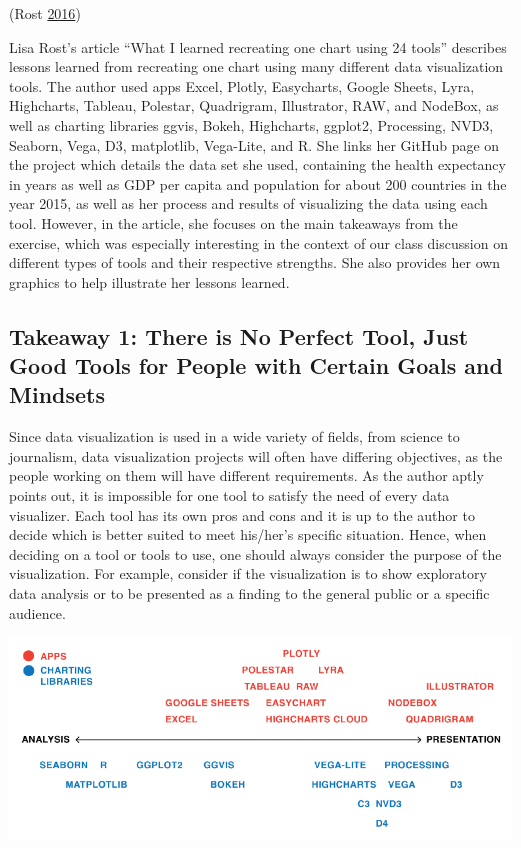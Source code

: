 \documentclass[]{book}
\begin{document}
(Rost \protect\hyperlink{ref-different_tools}{2016})

Lisa Rost's article ``What I learned recreating one chart using 24 tools'' describes lessons learned from recreating one chart using many different data visualization tools. The author used apps Excel, Plotly, Easycharts, Google Sheets, Lyra, Highcharts, Tableau, Polestar, Quadrigram, Illustrator, RAW, and NodeBox, as well as charting libraries ggvis, Bokeh, Highcharts, ggplot2, Processing, NVD3, Seaborn, Vega, D3, matplotlib, Vega-Lite, and R. She links her GitHub page on the project which details the data set she used, containing the health expectancy in years as well as GDP per capita and population for about 200 countries in the year 2015, as well as her process and results of visualizing the data using each tool. However, in the article, she focuses on the main takeaways from the exercise, which was especially interesting in the context of our class discussion on different types of tools and their respective strengths. She also provides her own graphics to help illustrate her lessons learned.

\hypertarget{takeaway-1-there-is-no-perfect-tool-just-good-tools-for-people-with-certain-goals-and-mindsets}{%
\subsection{Takeaway 1: There is No Perfect Tool, Just Good Tools for People with Certain Goals and Mindsets}\label{takeaway-1-there-is-no-perfect-tool-just-good-tools-for-people-with-certain-goals-and-mindsets}}

Since data visualization is used in a wide variety of fields, from science to journalism, data visualization projects will often have differing objectives, as the people working on them will have different requirements. As the author aptly points out, it is impossible for one tool to satisfy the need of every data visualizer. Each tool has its own pros and cons and it is up to the author to decide which is better suited to meet his/her's specific situation. Hence, when deciding on a tool or tools to use, one should always consider the purpose of the visualization. For example, consider if the visualization is to show exploratory data analysis or to be presented as a finding to the general public or a specific audience.

\includegraphics{images/analysis_spectrum.png}
\end{document}
